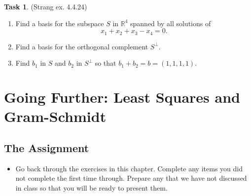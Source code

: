 \documentclass[10pt,]{book}
\theoremstyle{plain}
\theoremstyle{definition}
\numberwithin{equation}{section}
\newtheorem{task}{Task}[chapter]
\begin{document}
\begin{task}
\label{task-144}
(Strang ex. 4.4.24)
        \begin{enumerate}
\item{}
            Find a basis for the subspace \(S\) in \(\mathbb{R}^4\)
            spanned by all solutions of
            \[
              x_1 + x_2 + x_3 - x_4 = 0.
            \]
          \item{}
            Find a basis for the orthogonal complement \(S^{\perp}\).
          \item{}
            Find \(b_1\) in \(S\) and \(b_2\) in \(S^{\perp}\) so that
            \(b_1 + b_2 = b = (1,1,1,1)\).
          \end{enumerate}
\end{task}
\clearpage
\typeout{************************************************}
\typeout{************************************************}
\section[Going Further: Least Squares and Gram-Schmidt]{Going Further: Least Squares and Gram-Schmidt}\label{section-gf-ls-gs}
\typeout{************************************************}
\typeout{************************************************}
\subsection[The Assignment]{The Assignment}\label{subsection-113}
\begin{itemize}
\item{}
        Go back through the exercises in this chapter. Complete any items you
        did not complete the first time through. Prepare any that we have not
        discussed in class so that you will be ready to present them.
      \end{itemize}
\typeout{************************************************}
\typeout{************************************************}
\end{document}
